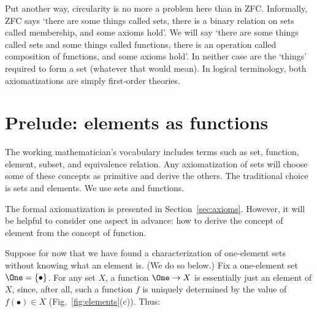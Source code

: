 \documentclass[12pt]{article}
\begin{document}
Put another way, circularity is no more a problem here than in ZFC.
Informally, ZFC says `there are some things called sets, there is a binary
relation on sets called membership, and some axioms hold'.  We will say
`there are some things called sets and some things called functions, there
is an operation called composition of functions, and some axioms hold'.  In
neither case are the `things' required to form a set (whatever that would
mean).  In logical terminology, both axiomatizations are simply first-order
theories.


\section{Prelude: elements as functions}
\label{sec:fns-and-elts}


The working mathematician's vocabulary includes terms such as set,
function, element, subset, and equivalence relation.  Any axiomatization of
sets will choose some of these concepts as primitive and derive the others.
The traditional choice is sets and elements.  We use sets and functions.

The formal axiomatization is presented in Section~\ref{sec:axioms}.
However, it will be helpful to consider one aspect in advance: how to
derive the concept of element from the concept of function.

Suppose for now that we have found a characterization of one-element sets
without knowing what an element is.  (We do so below.)  Fix a one-element
set $\One = \{ \bullet \}$.  For any set $X$, a function $\One \to X$ is
essentially just an element of $X$, since, after all, such a function $f$
is uniquely determined by the value of $f(\bullet) \in X$
(Fig.~\ref{fig:elements}(c)).  Thus:
% 
\end{document}
